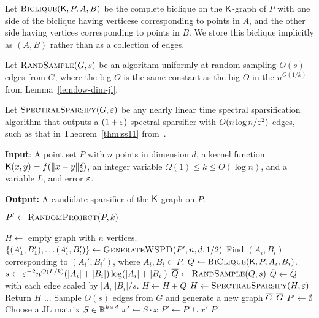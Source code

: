 Let $\textsc{Biclique}(\k, P, A, B)$ be the complete biclique on the $\k$-graph of $P$ with one side of the biclique having verticese corresponding to points in $A$, and the other side having vertices corresponding to points in $B$. We store this biclique implicitly as $(A, B)$ rather than as a collection of edges. 

Let $\textsc{RandSample}(G, s)$ be an algorithm uniformly at random sampling $O(s)$ edges from $G$, where the big $O$ is the same constant as the big $O$ in the $n^{O(1/k)}$ from Lemma~\ref{lem:low-dim-jl}.

Let $\textsc{SpectralSparsify}(G, \eps)$ be any nearly linear time
spectral sparsification algorithm that outputs a $(1+\eps)$ spectral
sparsifier with $O(n \log n / \eps^2)$ edges, such as that in
Theorem~\ref{thm:ss11} from~\cite{ss11}.
\begin{algorithm}[!ht]\caption{}\label{alg:sparsify-lipschitz}
\begin{algorithmic}[1]
 

    \State \textbf{Input}: A point set $P$ with $n$ points in dimension $d$, a kernel function $\k(x,y) = f(\|x-y\|_2^2)$, an integer variable $\Omega(1) \leq k \leq O(\log n)$, and a variable $L$, and error $\eps$.
    
    \State \textbf{Output:} A candidate sparsifier of the $\k$-graph on $P$.
    
    \State
    $P' \gets \textsc{RandomProject}(P, k)$
    
    \State $H \gets $ empty graph with $n$ vertices.
    \State $\{(A_1', B_1'), \ldots (A_t', B_t')\} \gets \textsc{GenerateWSPD}(P', n , d, 1/2)$ 
        \State Find $(A_i, B_i)$ corresponding to $(A_i', B_i')$, where $A_i, B_i \subset P$.
        \State $Q \gets \textsc{BiClique}(\k, P, A_i, B_i)$.
        \State $s \leftarrow \eps^{-2} n^{O(L/k)} (|A_i|+|B_i|) \log (|A_i|+|B_i|)$
        \State $\overline{Q} \gets \textsc{RandSample}(Q, s)$
        \State $\overline{Q} \gets \overline{Q}$ with each edge scaled by $ |A_i||B_i| / s $.
        \State $H \gets H + \overline{Q}$
    \EndFor
    \State $H \gets \textsc{SpectralSparsify}( H , \epsilon )$ 
    \State Return $H$
\EndProcedure
{} 
    \State ... 
\EndProcedure
{}
    \State Sample $O(s)$ edges from $G$ and generate a new graph $\ov{G}$
    \State \Return $\ov{G}$
\EndProcedure
{}
    \State $P' \leftarrow \emptyset$
    \State Choose a JL matrix $S \in \R^{k \times d}$
        \State $x'\leftarrow S \cdot x $ 
        \State $P' \leftarrow P' \cup x'$
    \EndFor
    \State \Return $P'$
\EndProcedure
\end{algorithmic}
\end{algorithm}

